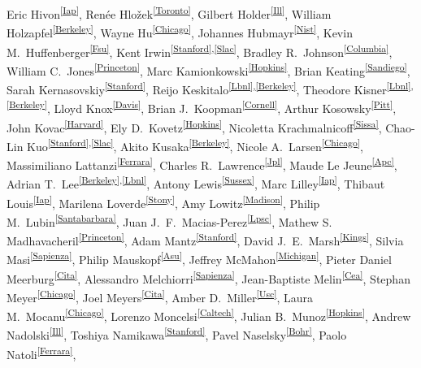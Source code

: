 Eric Hivon\textsuperscript{\ref{Iap}},
Ren\'{e}e Hlo\v{z}ek\textsuperscript{\ref{Toronto}},
Gilbert Holder\textsuperscript{\ref{Ill}},
William Holzapfel\textsuperscript{\ref{Berkeley}},
Wayne Hu\textsuperscript{\ref{Chicago}},
Johannes Hubmayr\textsuperscript{\ref{Nist}},
Kevin M.~Huffenberger\textsuperscript{\ref{Fsu}},
Kent Irwin\textsuperscript{\ref{Stanford},\ref{Slac}},
Bradley R.~Johnson\textsuperscript{\ref{Columbia}}, 
William C.~Jones\textsuperscript{\ref{Princeton}},
Marc Kamionkowski\textsuperscript{\ref{Hopkins}},
Brian Keating\textsuperscript{\ref{Sandiego}},
Sarah Kernasovskiy\textsuperscript{\ref{Stanford}},
Reijo Keskitalo\textsuperscript{\ref{Lbnl},\ref{Berkeley}},
Theodore Kisner\textsuperscript{\ref{Lbnl},\ref{Berkeley}},
Lloyd Knox\textsuperscript{\ref{Davis}},
Brian J.~Koopman\textsuperscript{\ref{Cornell}},
Arthur Kosowsky\textsuperscript{\ref{Pitt}},
John Kovac\textsuperscript{\ref{Harvard}},
Ely D.~Kovetz\textsuperscript{\ref{Hopkins}},
Nicoletta Krachmalnicoff\textsuperscript{\ref{Sissa}},
Chao-Lin Kuo\textsuperscript{\ref{Stanford},\ref{Slac}},
Akito Kusaka\textsuperscript{\ref{Berkeley}},
Nicole A.~Larsen\textsuperscript{\ref{Chicago}},
Massimiliano Lattanzi\textsuperscript{\ref{Ferrara}},
Charles R.~Lawrence\textsuperscript{\ref{Jpl}},
Maude Le Jeune\textsuperscript{\ref{Apc}},
Adrian T.~Lee\textsuperscript{\ref{Berkeley},\ref{Lbnl}},
Antony Lewis\textsuperscript{\ref{Sussex}},
Marc Lilley\textsuperscript{\ref{Iap}},
Thibaut Louis\textsuperscript{\ref{Iap}},
Marilena Loverde\textsuperscript{\ref{Stony}},
Amy Lowitz\textsuperscript{\ref{Madison}},
Philip M.~Lubin\textsuperscript{\ref{Santabarbara}},
Juan J.~F.~Macias-Perez\textsuperscript{\ref{Lpsc}},
Mathew S. Madhavacheril\textsuperscript{\ref{Princeton}},
Adam Mantz\textsuperscript{\ref{Stanford}},
David J.~E.~Marsh\textsuperscript{\ref{Kings}},
Silvia Masi\textsuperscript{\ref{Sapienza}},
Philip Mauskopf\textsuperscript{\ref{Asu}},
Jeffrey McMahon\textsuperscript{\ref{Michigan}},
Pieter Daniel Meerburg\textsuperscript{\ref{Cita}},
Alessandro Melchiorri\textsuperscript{\ref{Sapienza}},
Jean-Baptiste Melin\textsuperscript{\ref{Cea}},
Stephan Meyer\textsuperscript{\ref{Chicago}},
Joel Meyers\textsuperscript{\ref{Cita}},
Amber D.~Miller\textsuperscript{\ref{Usc}},
Laura M.~Mocanu\textsuperscript{\ref{Chicago}},
Lorenzo Moncelsi\textsuperscript{\ref{Caltech}},
Julian B.~Munoz\textsuperscript{\ref{Hopkins}},
Andrew Nadolski\textsuperscript{\ref{Ill}},
Toshiya Namikawa\textsuperscript{\ref{Stanford}},
Pavel Naselsky\textsuperscript{\ref{Bohr}},
Paolo Natoli\textsuperscript{\ref{Ferrara}},
